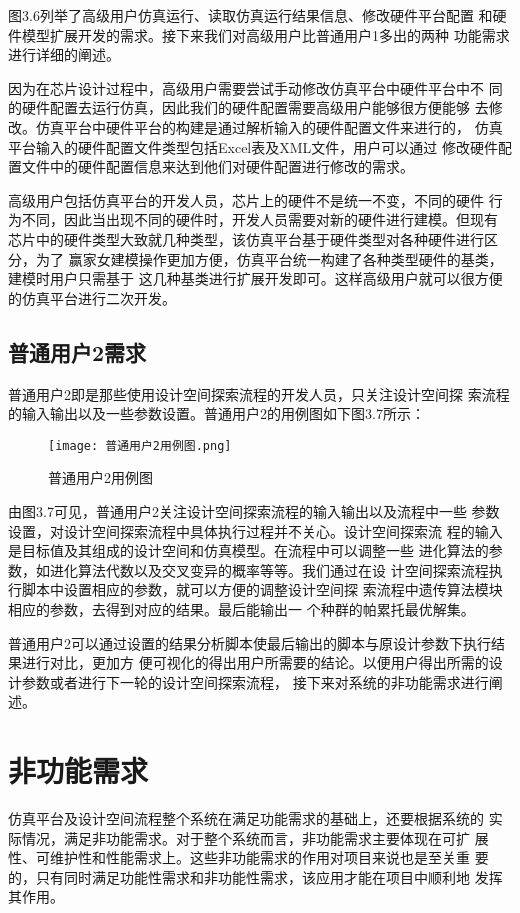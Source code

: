 图3.6列举了高级用户仿真运行、读取仿真运行结果信息、修改硬件平台配置
和硬件模型扩展开发的需求。接下来我们对高级用户比普通用户1多出的两种
功能需求进行详细的阐述。

因为在芯片设计过程中，高级用户需要尝试手动修改仿真平台中硬件平台中不
同的硬件配置去运行仿真，因此我们的硬件配置需要高级用户能够很方便能够
去修改。仿真平台中硬件平台的构建是通过解析输入的硬件配置文件来进行的，
仿真平台输入的硬件配置文件类型包括Excel表及XML文件，用户可以通过
修改硬件配置文件中的硬件配置信息来达到他们对硬件配置进行修改的需求。

高级用户包括仿真平台的开发人员，芯片上的硬件不是统一不变，不同的硬件
行为不同，因此当出现不同的硬件时，开发人员需要对新的硬件进行建模。但现有
芯片中的硬件类型大致就几种类型，该仿真平台基于硬件类型对各种硬件进行区分，为了
赢家女建模操作更加方便，仿真平台统一构建了各种类型硬件的基类，建模时用户只需基于
这几种基类进行扩展开发即可。这样高级用户就可以很方便的仿真平台进行二次开发。

\subsection{普通用户2需求}
普通用户2即是那些使用设计空间探索流程的开发人员，只关注设计空间探
索流程的输入输出以及一些参数设置。普通用户2的用例图如下图3.7所示：

\begin{figure}[h]
    \centering
    \texttt{[image: 普通用户2用例图.png]}
    \caption{普通用户2用例图}
    \label{fig:badge}
\end{figure}

由图3.7可见，普通用户2关注设计空间探索流程的输入输出以及流程中一些
参数设置，对设计空间探索流程中具体执行过程并不关心。设计空间探索流
程的输入是目标值及其组成的设计空间和仿真模型。在流程中可以调整一些
进化算法的参数，如进化算法代数以及交叉变异的概率等等。我们通过在设
计空间探索流程执行脚本中设置相应的参数，就可以方便的调整设计空间探
索流程中遗传算法模块相应的参数，去得到对应的结果。最后能输出一
个种群的帕累托最优解集。

普通用户2可以通过设置的结果分析脚本使最后输出的脚本与原设计参数下执行结果进行对比，更加方
便可视化的得出用户所需要的结论。以便用户得出所需的设计参数或者进行下一轮的设计空间探索流程，
接下来对系统的非功能需求进行阐述。

\section{非功能需求}
仿真平台及设计空间流程整个系统在满足功能需求的基础上，还要根据系统的
实际情况，满足非功能需求。对于整个系统而言，非功能需求主要体现在可扩
展性、可维护性和性能需求上。这些非功能需求的作用对项目来说也是至关重
要的，只有同时满足功能性需求和非功能性需求，该应用才能在项目中顺利地
发挥其作用。

